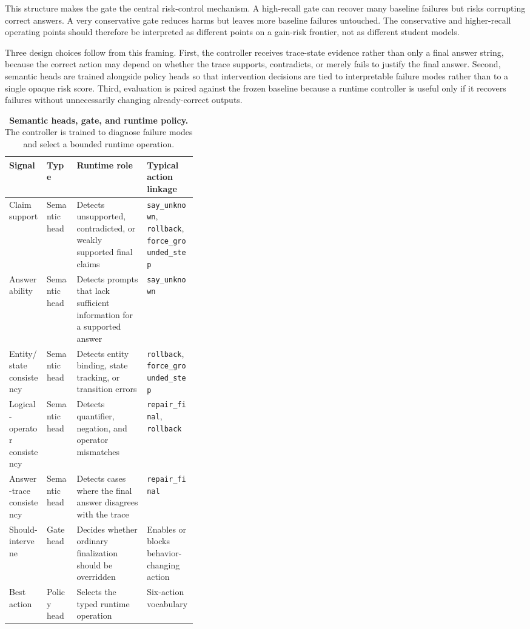 \documentclass[11pt]{article}
\begin{document}
This structure makes the gate the central risk-control mechanism. A high-recall gate can recover many baseline failures but risks corrupting correct answers. A very conservative gate reduces harms but leaves more baseline failures untouched. The conservative and higher-recall operating points should therefore be interpreted as different points on a gain-risk frontier, not as different student models.

Three design choices follow from this framing. First, the controller receives trace-state evidence rather than only a final answer string, because the correct action may depend on whether the trace supports, contradicts, or merely fails to justify the final answer. Second, semantic heads are trained alongside policy heads so that intervention decisions are tied to interpretable failure modes rather than to a single opaque risk score. Third, evaluation is paired against the frozen baseline because a runtime controller is useful only if it recovers failures without unnecessarily changing already-correct outputs.
\begin{table}[H]
\centering
\small
\caption{\textbf{Semantic heads, gate, and runtime policy.} The controller is trained to diagnose failure modes and select a bounded runtime operation.}
\label{tab:heads}
\begin{tabularx}{\linewidth}{p{0.20\linewidth}p{0.16\linewidth}Y Y}
\toprule
Signal & Type & Runtime role & Typical action linkage \\
\midrule
Claim support & Semantic head & Detects unsupported, contradicted, or weakly supported final claims & \texttt{say\_unknown}, \texttt{rollback}, \texttt{force\_grounded\_step} \\
Answerability & Semantic head & Detects prompts that lack sufficient information for a supported answer & \texttt{say\_unknown} \\
Entity/state consistency & Semantic head & Detects entity binding, state tracking, or transition errors & \texttt{rollback}, \texttt{force\_grounded\_step} \\
Logical-operator consistency & Semantic head & Detects quantifier, negation, and operator mismatches & \texttt{repair\_final}, \texttt{rollback} \\
Answer-trace consistency & Semantic head & Detects cases where the final answer disagrees with the trace & \texttt{repair\_final} \\
Should-intervene & Gate head & Decides whether ordinary finalization should be overridden & Enables or blocks behavior-changing action \\
Best action & Policy head & Selects the typed runtime operation & Six-action vocabulary \\
\bottomrule
\end{tabularx}
\end{table}
\end{document}
